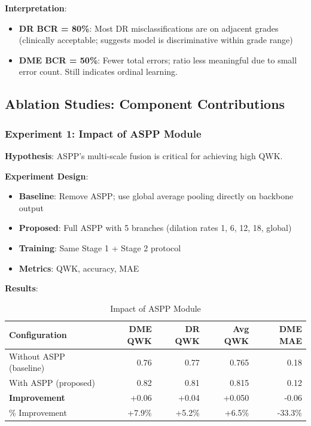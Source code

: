 \documentclass[12pt,a4paper]{article}
\begin{document}
\textbf{Interpretation}:

\begin{itemize}
    \item \textbf{DR BCR = 80\%}: Most DR misclassifications are on adjacent grades (clinically acceptable; suggests model is discriminative within grade range)
    
    \item \textbf{DME BCR = 50\%}: Fewer total errors; ratio less meaningful due to small error count. Still indicates ordinal learning.
\end{itemize}

\subsection{Ablation Studies: Component Contributions}

\subsubsection{Experiment 1: Impact of ASPP Module}

\textbf{Hypothesis}: ASPP's multi-scale fusion is critical for achieving high QWK.

\textbf{Experiment Design}:
\begin{itemize}
    \item \textbf{Baseline}: Remove ASPP; use global average pooling directly on backbone output
    \item \textbf{Proposed}: Full ASPP with 5 branches (dilation rates 1, 6, 12, 18, global)
    \item \textbf{Training}: Same Stage 1 + Stage 2 protocol
    \item \textbf{Metrics}: QWK, accuracy, MAE
\end{itemize}

\textbf{Results}:

\begin{table}[H]
\centering
\small
\caption{Impact of ASPP Module}
\begin{tabular}{|l|r|r|r|r|}
\hline
\textbf{Configuration} & \textbf{DME QWK} & \textbf{DR QWK} & \textbf{Avg QWK} & \textbf{DME MAE} \\
\hline
Without ASPP (baseline) & 0.76 & 0.77 & 0.765 & 0.18 \\
With ASPP (proposed) & 0.82 & 0.81 & 0.815 & 0.12 \\
\hline
\textbf{Improvement} & +0.06 & +0.04 & +0.050 & -0.06 \\
\%  Improvement & +7.9\% & +5.2\% & +6.5\% & -33.3\% \\
\hline
\end{tabular}
\end{table}
\end{document}

